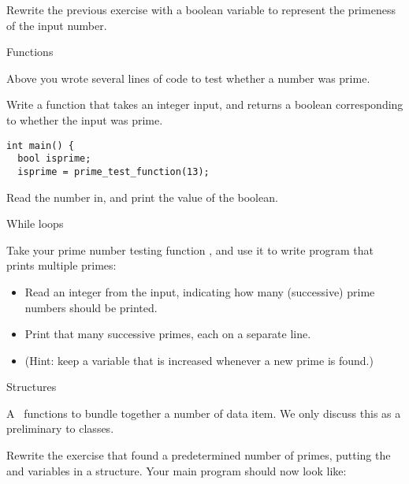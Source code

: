 \begin{exercise}
  \label{ex:prime:test2}
  Rewrite the previous exercise with a boolean variable to represent
  the primeness of the input number.
\end{exercise}

 {Functions}

\prerequisite{\ref{ch:function}}

Above you wrote several lines of code to test whether a number was
prime.

\begin{exercise}
  \label{ex:prime:func}
  Write a function  that takes an integer input, and returns a boolean
  corresponding to whether the input was prime.
\begin{verbatim}
int main() {
  bool isprime;
  isprime = prime_test_function(13);
\end{verbatim}
  Read the number in, and print the value of the boolean.
\end{exercise}

 {While loops}

\prerequisite{\ref{sec:loopuntil}}

\begin{exercise}
  \label{ex:prime:while}
  Take your prime number testing function , and use it to
  write program that prints multiple primes:
  \begin{itemize}
  \item Read an integer  from the input, indicating how
    many (successive) prime numbers should be printed.
  \item Print that many successive primes, each on a separate line.
  \item (Hint: keep a variable
     that is increased whenever a new prime is found.)
  \end{itemize}
\end{exercise}

 {Structures}

\prerequisite{\ref{sec:struct}, \ref{sec:reference}}

A~ functions to bundle together a number of data item. We
only discuss this as a preliminary to classes.

\begin{exercise}
  \label{ex:prime:struct}
  Rewrite the exercise that found a predetermined number of primes,
  putting the  and
   variables in a structure. Your main program should
  now look like:
\end{exercise}


